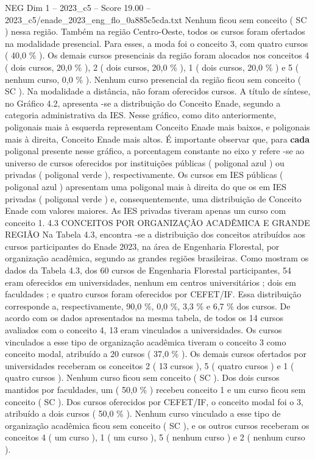 \begin{textsample}{NEG Dim 1 – 2023\_c5 – Score 19.00 – 2023\_c5/enade\_2023\_eng\_flo\_0a885c5cda.txt}
Nenhum ficou sem conceito ( SC ) nessa região.
Também na região Centro-Oeste, todos os cursos foram ofertados na modalidade presencial.
Para esses, a moda foi o conceito 3, com quatro cursos ( 40,0 \% ).
Os demais cursos presenciais da região foram alocados nos conceitos 4 ( dois cursos, 20,0 \% ), 2 ( dois cursos, 20,0 \% ), 1 ( dois cursos, 20,0 \% ) e 5 ( nenhum curso, 0,0 \% ).
Nenhum curso presencial da região ficou sem conceito ( SC ).
Na modalidade a distância, não foram oferecidos cursos.
A título de síntese, no Gráfico 4.2, apresenta -se a distribuição do Conceito Enade, segundo a categoria administrativa da IES.
Nesse gráfico, como dito anteriormente, poligonais mais à esquerda representam Conceito Enade mais baixos, e poligonais mais à direita, Conceito Enade mais altos.
É importante observar que, para \textbf{cada} poligonal presente nesse gráfico, a porcentagem constante no eixo y refere -se ao universo de cursos oferecidos por instituições públicas ( poligonal azul ) ou privadas ( poligonal verde ), respectivamente.
Os cursos em IES públicas ( poligonal azul ) apresentam uma poligonal mais à direita do que os em IES privadas ( poligonal verde ) e, consequentemente, uma distribuição de Conceito Enade com valores maiores.
As IES privadas tiveram apenas um curso com conceito 1. 4.3 CONCEITOS POR ORGANIZAÇÃO ACADÊMICA E GRANDE REGIÃO Na Tabela 4.3, encontra -se a distribuição dos conceitos atribuídos aos cursos participantes do Enade 2023, na área de Engenharia Florestal, por organização acadêmica, segundo as grandes regiões brasileiras.
Como mostram os dados da Tabela 4.3, dos 60 cursos de Engenharia Florestal participantes, 54 eram oferecidos em universidades, nenhum em centros universitários ; dois em faculdades ; e quatro cursos foram oferecidos por CEFET/IF.
Essa distribuição corresponde a, respectivamente, 90,0 \%, 0,0 \%, 3,3 \% e 6,7 \% dos cursos.
De acordo com os dados apresentados na mesma tabela, de todos os 14 cursos avaliados com o conceito 4, 13 eram vinculados a universidades.
Os cursos vinculados a esse tipo de organização acadêmica tiveram o conceito 3 como conceito modal, atribuído a 20 cursos ( 37,0 \% ).
Os demais cursos ofertados por universidades receberam os conceitos 2 ( 13 cursos ), 5 ( quatro cursos ) e 1 ( quatro cursos ).
Nenhum curso ficou sem conceito ( SC ).
Dos dois cursos mantidos por faculdades, um ( 50,0 \% ) recebeu conceito 1 e um curso ficou sem conceito ( SC ).
Dos cursos oferecidos por CEFET/IF, o conceito modal foi o 3, atribuído a dois cursos ( 50,0 \% ).
Nenhum curso vinculado a esse tipo de organização acadêmica ficou sem conceito ( SC ), e os outros cursos receberam os conceitos 4 ( um curso ), 1 ( um curso ), 5 ( nenhum curso ) e 2 ( nenhum curso ).

\end{textsample}
